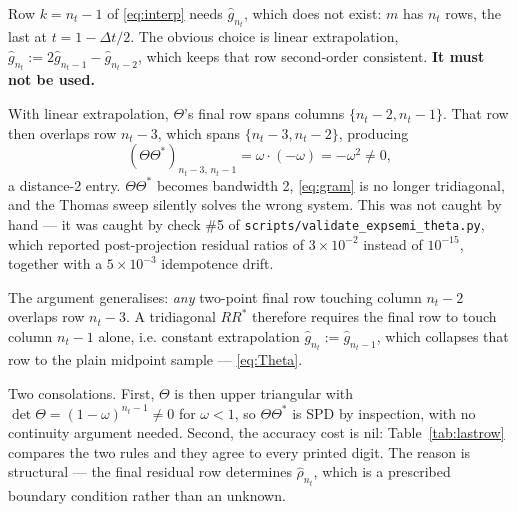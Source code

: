 \documentclass[11pt]{article}
\newcommand{\dt}{\Delta t}
\newcommand{\code}[1]{\texttt{#1}}
\begin{document}
Row $k=n_t-1$ of \eqref{eq:interp} needs $\hat g_{n_t}$, which does not exist: $m$ has
$n_t$ rows, the last at $t=1-\dt/2$. The obvious choice is linear extrapolation,
$\hat g_{n_t}:=2\hat g_{n_t-1}-\hat g_{n_t-2}$, which keeps that row second-order
consistent. \textbf{It must not be used.}

With linear extrapolation, $\Theta$'s final row spans columns $\{n_t-2,n_t-1\}$. That row
then overlaps row $n_t-3$, which spans $\{n_t-3,n_t-2\}$, producing
\begin{equation}
  (\Theta\Theta^*)_{n_t-3,\,n_t-1}
  = \omega\cdot(-\omega) = -\omega^2 \neq 0 ,
\end{equation}
a distance-2 entry. $\Theta\Theta^*$ becomes bandwidth 2, \eqref{eq:gram} is no longer
tridiagonal, and the Thomas sweep silently solves the wrong system. This was not caught
by hand --- it was caught by check \#5 of \code{scripts/validate\_expsemi\_theta.py},
which reported post-projection residual ratios of $3\times10^{-2}$ instead of
$10^{-15}$, together with a $5\times10^{-3}$ idempotence drift.

The argument generalises: \emph{any} two-point final row touching column $n_t-2$ overlaps
row $n_t-3$. A tridiagonal $RR^*$ therefore requires the final row to touch column
$n_t-1$ alone, i.e. constant extrapolation $\hat g_{n_t}:=\hat g_{n_t-1}$, which collapses
that row to the plain midpoint sample --- \eqref{eq:Theta}.

Two consolations. First, $\Theta$ is then upper triangular with
$\det\Theta=(1-\omega)^{n_t-1}\neq0$ for $\omega<1$, so $\Theta\Theta^*$ is SPD by
inspection, with no continuity argument needed. Second, the accuracy cost is nil:
Table~\ref{tab:lastrow} compares the two rules and they agree to every printed digit. The
reason is structural --- the final residual row determines $\hat\rho_{n_t}$, which is a
prescribed boundary condition rather than an unknown.
\end{document}
